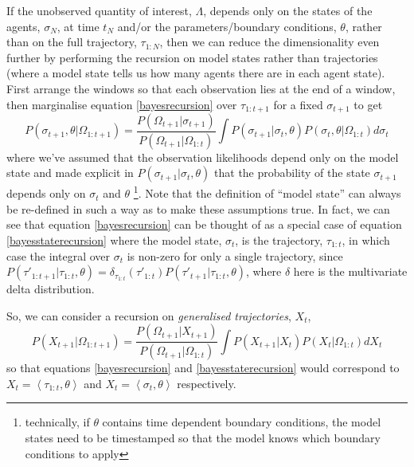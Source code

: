 \documentclass{article}
\begin{document}
If the unobserved quantity of interest, $\Lambda$, depends only on the states of the agents, $\sigma_N$, at time $t_N$ and/or the parameters/boundary conditions, $\theta$, rather than on the full trajectory, $\tau_{1:N}$, then we can reduce the dimensionality even further by performing the recursion on model states rather than trajectories (where a model state tells us how many agents there are in each agent state). First arrange the windows so that each observation lies at the end of a window, then marginalise equation \eqref{bayesrecursion} over $\tau_{1:t+1}$ for a fixed $\sigma_{t+1}$ to get
\begin{equation}
P\left(\sigma_{t+1}, \theta | \Omega_{1:t+1}\right)
=
\frac{ P(\Omega_{t+1}|\sigma_{t+1}) 
}
{	P(\Omega_{t+1}| \Omega_{1:t}) }
\int P(\sigma_{t+1}|\sigma_t,\theta)P\left(\sigma_{t},\theta| \Omega_{1:t}\right) d \sigma_t
\label{bayesstaterecursion}
\end{equation}
where we've assumed that the observation likelihoods depend only on the model state and made explicit in $P(\sigma_{t+1}|\sigma_t,\theta)$ that the probability of the state $\sigma_{t+1}$ depends only on $\sigma_t$ and $\theta$  \footnote{technically, if $\theta$ contains time dependent boundary conditions, the model states need to be timestamped so that the model knows which boundary conditions to apply}.   Note that the definition of ``model state'' can always be re-defined in such a way as to make these assumptions true. In fact, we can see that equation \eqref{bayesrecursion} can be thought of as a special case of equation \eqref{bayesstaterecursion} where the model state, $\sigma_t$, is the trajectory, $\tau_{1:t}$, in which case the integral over $\sigma_t$ is non-zero for only a single trajectory, since $P(\tau'_{1:t+1}|\tau_{1:t},\theta) = \delta_{\tau_{1:t}}(\tau'_{1:t})P(\tau'_{t+1}|\tau_{1:t},\theta)$, where $\delta$ here is the multivariate delta distribution.

So, we can consider a recursion on \textit{generalised trajectories}, $X_t$,
\begin{equation}
P\left(X_{t+1}| \Omega_{1:t+1}\right)
=
\frac{ P(\Omega_{t+1}|X_{t+1})}
{	P(\Omega_{t+1}| \Omega_{1:t}) }
\int P(X_{t+1}|X_t)P\left(X_{t}| \Omega_{1:t}\right) d X_t
\label{generalisedbayesrecursion}
\end{equation}
so that equations \eqref{bayesrecursion} and \eqref{bayesstaterecursion} would correspond to $X_t=\left<\tau_{1:t},\theta\right>$ and $X_t=\left<\sigma_t,\theta\right>$ respectively.
\end{document}
